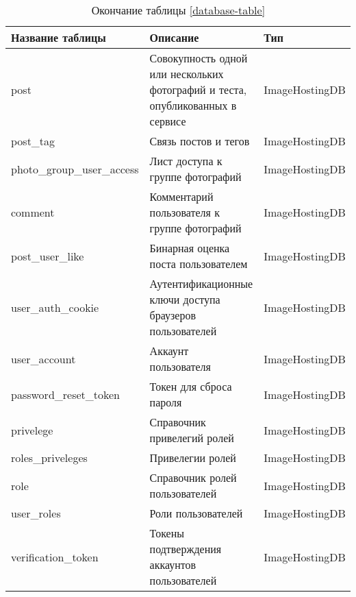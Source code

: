 \begin{table}[H]
  \caption*{\onehalfspacing Окончание таблицы \ref{database-table}}
  \begin{tabular}{|p{6cm}|p{6cm}|p{4cm}|}
  \hline Название таблицы & Описание & Тип \\
  \hline post & Совокупность одной или нескольких фотографий и теста, опубликованных в сервисе  & ImageHostingDB \\
  \hline post_tag & Связь постов и тегов & ImageHostingDB \\
  \hline photo_group_user_access & Лист доступа к группе фотографий & ImageHostingDB \\
  \hline comment & Комментарий пользователя к группе фотографий & ImageHostingDB \\
  \hline post_user_like & Бинарная оценка поста пользователем & ImageHostingDB \\
  \hline user_auth_cookie & Аутентификационные ключи доступа браузеров пользователей & ImageHostingDB \\
  \hline user_account & Аккаунт пользователя & ImageHostingDB \\
  \hline password_reset_token & Токен для сброса пароля & ImageHostingDB \\
  \hline privelege & Справочник привелегий ролей & ImageHostingDB \\
  \hline roles_priveleges & Привелегии ролей & ImageHostingDB \\
  \hline role & Справочник ролей пользователей & ImageHostingDB \\
  \hline user_roles & Роли пользователей & ImageHostingDB \\
  \hline verification_token & Токены подтверждения аккаунтов пользователей & ImageHostingDB \\
  \hline
  \end{tabular}
\end{table}


